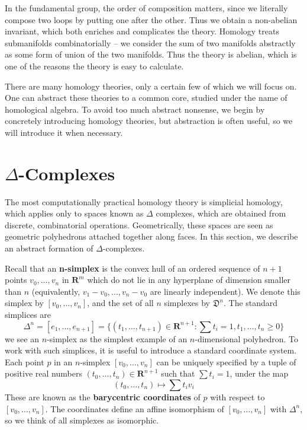 In the fundamental group, the order of composition matters, since we literally compose two loops by putting one after the other. Thus we obtain a non-abelian invariant, which both enriches and complicates the theory. Homology treats submanifolds combinatorially -- we consider the sum of two manifolds abstractly as some form of union of the two manifolds. Thus the theory is abelian, which is one of the reasons the theory is easy to calculate.

There are many homology theories, only a certain few of which we will focus on. One can abstract these theories to a common core, studied under the name of homological algebra. To avoid too much abstract nonsense, we begin by concretely introducing homology theories, but abstraction is often useful, so we will introduce it when necessary.

\section{$\Delta$-Complexes}

The most computationally practical homology theory is simplicial homology, which applies only to spaces known as $\Delta$ complexes, which are obtained from discrete, combinatorial operations. Geometrically, these spaces are seen as geometric polyhedrons attached together along faces. In this section, we describe an abstract formation of $\Delta$-complexes.

Recall that an {\bf n-simplex} is the convex hull of an ordered sequence of $n+1$ points $v_0, \dots, v_n$ in $\mathbf{R}^m$ which do not lie in any hyperplane of dimension smaller than $n$ (equivalently, $v_1 - v_0, \dots, v_n - v_0$ are linearly independent). We denote this simplex by $[v_0, \dots, v_n]$, and the set of all $n$ simplexes by $\mathfrak{D}^n$. The standard simplices are
%
\[ \Delta^n = [e_1, \dots, e_{n+1}] = \{ (t_1, \dots, t_{n+1}) \in \mathbf{R}^{n+1} : \sum t_i = 1, t_1, \dots, t_n \geq 0 \} \]
%
we see an $n$-simplex as the simplest example of an $n$-dimensional polyhedron. To work with such simplices, it is useful to introduce a standard coordinate system. Each point $p$ in an $n$-simplex $[v_0, \dots, v_n]$ can be uniquely specified by a tuple of positive real numbers $(t_0, \dots, t_n) \in \mathbf{R}^{n+1}$ such that $\sum t_i = 1$, under the map
%
\[ (t_0, \dots, t_n) \mapsto \sum t_i v_i \]
%
These are known as the {\bf barycentric coordinates} of $p$ with respect to $[v_0, \dots, v_n]$. The coordinates define an affine isomorphism of $[v_0, \dots, v_n]$ with $\Delta^n$, so we think of all simplexes as isomorphic.

